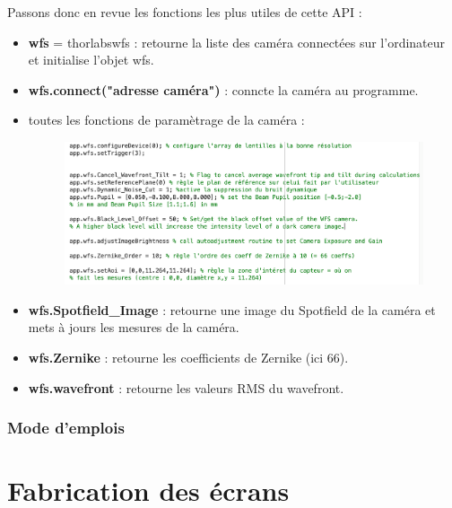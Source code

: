 Passons donc en revue les fonctions les plus utiles de cette API :
\begin{itemize}
    \item \textbf{wfs} = thorlabswfs : retourne la liste des caméra connectées sur l'ordinateur et initialise l'objet wfs.
    \item \textbf{wfs.connect("adresse caméra")} : conncte la caméra au programme.
    \item toutes les fonctions de paramètrage de la caméra :
          \begin{figure}[H]
              \includegraphics[width = \textwidth]{assets/figures/ameliorations/fonctions de paramètres caméra.png}
          \end{figure}
    \item \textbf{wfs.Spotfield\_Image} : retourne une image du Spotfield de la caméra et mets à jours les mesures de la caméra.
    \item \textbf{wfs.Zernike} : retourne les coefficients de Zernike (ici 66).
    \item \textbf{wfs.wavefront} : retourne les valeurs RMS du wavefront.
\end{itemize}

\newpage
\subsubsection{Mode d'emplois}


\newpage
\section{Fabrication des écrans}

